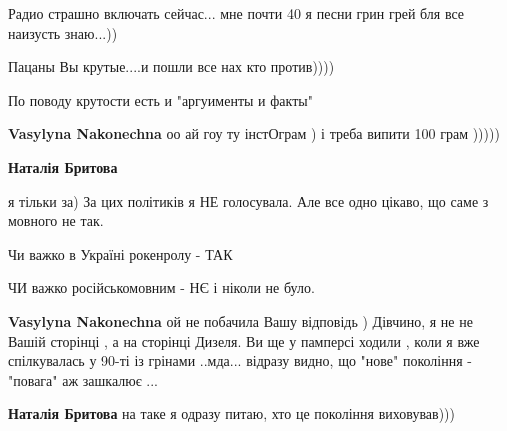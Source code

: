 \begin{itemize}
\begin{itemize}
Радио страшно включать сейчас... мне почти 40 я песни грин грей бля все наизусть
знаю...))

Пацаны Вы крутые....и пошли все нах кто против))))

По поводу крутости есть и "аргуименты и факты"


 
\textbf{Vasylyna Nakonechna} оо ай гоу ту інстОграм ) і треба випити 100 грам )))))

 
\textbf{Наталія Бритова} 

я тільки за) За цих політиків я НЕ голосувала. Але все одно цікаво, що саме з
мовного не так.

Чи важко в Україні рокенролу - ТАК

ЧИ важко російськомовним - НЄ і ніколи не було.

 
\textbf{Vasylyna Nakonechna} ой не побачила Вашу відповідь ) Дівчино, я не не Вашій сторінці , а на сторінці Дизеля. Ви ще у памперсі ходили , коли я вже спілкувалась у 90-ті із грінами ..мда... відразу видно, що "нове" покоління - "повага" аж зашкалює ...

 
\textbf{Наталія Бритова} на таке я одразу питаю, хто це покоління виховував)))

 

\end{itemize}
\end{itemize}
